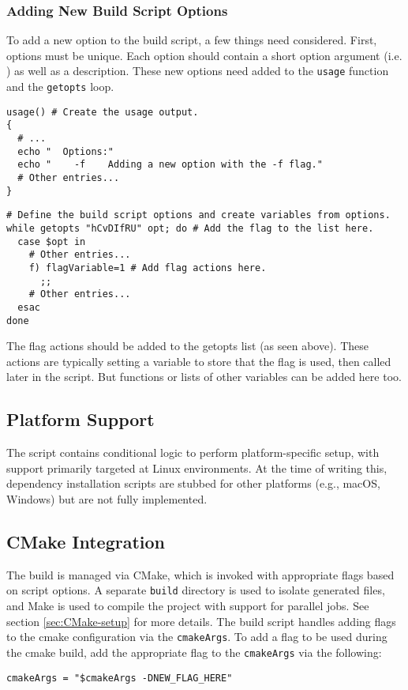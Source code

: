 \subsubsection{Adding New Build Script Options}

To add a new option to the build script, a few things need considered. First, options must be unique. Each option should contain a short option argument (i.e. ) as well as a description. These new options need added to the \texttt{usage} function and the \texttt{getopts} loop.
\begin{lstlisting}[style=shellstyle]
usage() # Create the usage output.
{
  # ...
  echo "  Options:"
  echo "    -f    Adding a new option with the -f flag."
  # Other entries...
}
\end{lstlisting}
\begin{lstlisting}[style=shellstyle]
# Define the build script options and create variables from options.
while getopts "hCvDIfRU" opt; do # Add the flag to the list here.
  case $opt in
    # Other entries...
    f) flagVariable=1 # Add flag actions here.
      ;;
    # Other entries...
  esac
done
\end{lstlisting}
The flag actions should be added to the getopts list (as seen above). These actions are typically setting a variable to store that the flag is used, then called later in the script. But functions or lists of other variables can be added here too.

\subsection{Platform Support}

The script contains conditional logic to perform platform-specific setup, with support primarily targeted at Linux environments. At the time of writing this, dependency installation scripts are stubbed for other platforms (e.g., macOS, Windows) but are not fully implemented.

\subsection{CMake Integration}

The build is managed via CMake, which is invoked with appropriate flags based on script options. A separate \texttt{build} directory is used to isolate generated files, and Make is used to compile the project with support for parallel jobs. See section \ref{sec:CMake-setup} for more details. The build script handles adding flags to the cmake configuration via the \texttt{cmakeArgs}. To add a flag to be used during the cmake build, add the appropriate flag to the \texttt{cmakeArgs} via the following:
\begin{lstlisting}[style=shellstyle]
cmakeArgs = "$cmakeArgs -DNEW_FLAG_HERE"
\end{lstlisting}

